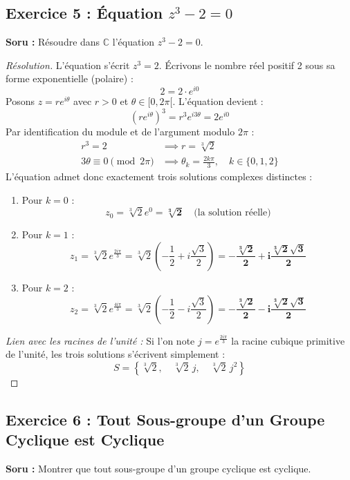 \documentclass[12pt,a4paper]{report}
\begin{document}
\subsection*{Exercice 5 : Équation $z^3 - 2 = 0$}
\textbf{Soru :} Résoudre dans $\mathbb{C}$ l'équation $z^3 - 2 = 0$.

\begin{proof}[Résolution]
L'équation s'écrit $z^3 = 2$.
Écrivons le nombre réel positif 2 sous sa forme exponentielle (polaire) :
\[ 2 = 2 \cdot e^{i 0} \]
Posons $z = r e^{i\theta}$ avec $r > 0$ et $\theta \in [0, 2\pi[$. L'équation devient :
\[ (r e^{i\theta})^3 = r^3 e^{i 3\theta} = 2 e^{i 0} \]
Par identification du module et de l'argument modulo $2\pi$ :
\begin{align*}
r^3 = 2 &\implies r = \sqrt[3]{2} \\
3\theta \equiv 0 \pmod{2\pi} &\implies \theta_k = \frac{2k\pi}{3}, \quad k \in \{0, 1, 2\}
\end{align*}
L'équation admet donc exactement trois solutions complexes distinctes :
\begin{enumerate}
    \item Pour $k = 0$ :
    \[ z_0 = \sqrt[3]{2} e^0 = \mathbf{\sqrt[3]{2}} \quad \text{(la solution réelle)} \]
    \item Pour $k = 1$ :
    \[ z_1 = \sqrt[3]{2} e^{\frac{2i\pi}{3}} = \sqrt[3]{2} \left(-\frac{1}{2} + i \frac{\sqrt{3}}{2}\right) = \mathbf{-\frac{\sqrt[3]{2}}{2} + i \frac{\sqrt[3]{2}\sqrt{3}}{2}} \]
    \item Pour $k = 2$ :
    \[ z_2 = \sqrt[3]{2} e^{\frac{4i\pi}{3}} = \sqrt[3]{2} \left(-\frac{1}{2} - i \frac{\sqrt{3}}{2}\right) = \mathbf{-\frac{\sqrt[3]{2}}{2} - i \frac{\sqrt[3]{2}\sqrt{3}}{2}} \]
\end{enumerate}
\textit{Lien avec les racines de l'unité :} Si l'on note $j = e^{\frac{2i\pi}{3}}$ la racine cubique primitive de l'unité, les trois solutions s'écrivent simplement :
\[ S = \left\{ \sqrt[3]{2}, \quad \sqrt[3]{2}\,j, \quad \sqrt[3]{2}\,j^2 \right\} \]
\end{proof}

\vspace{0.5cm}

\subsection*{Exercice 6 : Tout Sous-groupe d'un Groupe Cyclique est Cyclique}
\textbf{Soru :} Montrer que tout sous-groupe d'un groupe cyclique est cyclique.
\end{document}
